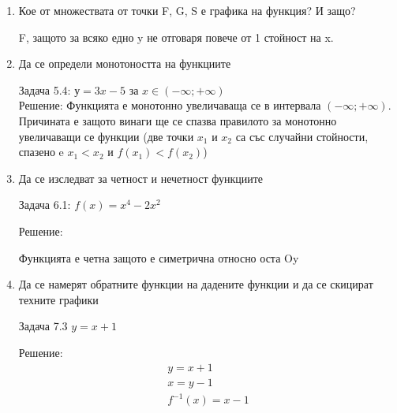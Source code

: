 \documentclass[a4paper, 20pt, fleqn, border=2pt]{article}
\begin{document}
\begin{enumerate}
    \item Кое от множествата от точки F, G, S е графика на функция? И защо?
\par
\par
F, защото за всяко едно y не отговаря повече от 1 стойност на x.  


    \item Да се определи монотоността на функциите
\par
\par

Задача 5.4: $у = 3x - 5$ за $x \in (-\infty;+\infty)$ \\

Решение:
Функцията е монотонно увеличаваща се в интервала $(-\infty;+\infty)$. Причината е защото винаги ще се спазва правилото за монотонно увеличаващи се функции (две точки $x_1$ и $x_2$ са със случайни стойности, спазено e $x_1 < x_2$ и $f(x_1) < f(x_2)$)


    \item Да се изследват за четност и нечетност функциите
\par
\par

Задача 6.1: $f(x)=x^4 - 2x^2$

Решение:

Функцията е четна защото е симетрична относно оста Oy

    \item Да се намерят обратните функции на дадените функции и да се скицират техните графики
\par
\par

Задача 7.3 $y = x + 1$

Решение:
\begin{equation}
\begin{split}
    y = x + 1 \\
    x = y - 1 \\
    f^{-1}(x) = x - 1
\end{split}
\end{equation}



\end{enumerate}
\end{document}
